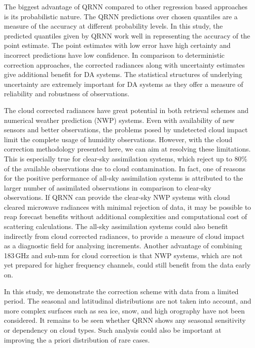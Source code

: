 \documentclass[amt, manuscript]{copernicus}
\begin{document}
The biggest advantage of QRNN compared to other regression based approaches is its probabilistic nature. The QRNN predictions over chosen quantiles are a measure of the accuracy at different probability levels. In this study, the predicted quantiles given by QRNN work well in representing the accuracy of the point estimate. The point estimates with low error have high certainty and incorrect predictions have low confidence. In comparison to deterministic correction approaches, the corrected radiances along with uncertainty estimates give additional benefit for DA systems. The statistical structures of underlying uncertainty are extremely important for DA systems as they offer a measure of reliability and robustness of observations.

The cloud corrected radiances have great potential in both retrieval schemes and numerical weather prediction (NWP) systems. Even with availability of new sensors and better observations, the problems posed by undetected cloud impact limit the complete usage of humidity observations. However, with the cloud correction methodology presented here, we can aim at resolving these limitations. This is especially true for clear-sky assimilation systems, which reject up to 80\% of the available observations due to cloud contamination. In fact, one of reasons for the positive performance of all-sky assimilation systems is attributed to the larger number of assimilated observations in comparison to clear-sky observations. If QRNN can provide the clear-sky NWP systems with cloud cleared microwave radiances with minimal rejection of data, it may be possible to reap forecast benefits without additional complexities and computational cost of scattering calculations. The all-sky assimilation systems could also benefit indirectly from cloud corrected radiances, to provide a measure of cloud impact as a diagnostic field for analysing increments. Another advantage of combining 183\,GHz and sub-mm for cloud correction is that NWP systems, which are not yet prepared for higher frequency channels, could still benefit from the data early on. 

In this study, we demonstrate the correction scheme with data from a limited period. The seasonal and latitudinal distributions are not taken into account, and more complex surfaces such as sea ice, snow, and high orography have not been considered. It remains to be seen whether QRNN shows any seasonal sensitivity or dependency on cloud types. Such analysis could also be important at improving the a priori distribution of rare cases. 
\end{document}
